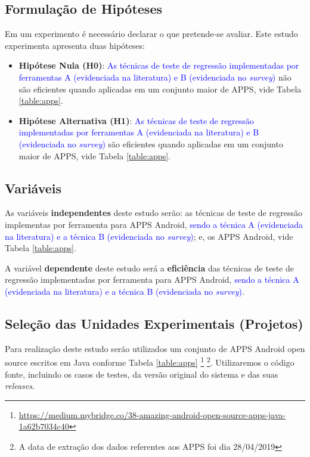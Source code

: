 \subsection{Formulação de Hipóteses}

Em um experimento é necessário declarar o que pretende-se avaliar. Este estudo experimenta apresenta duas hipóteses:

\begin{itemize}

    \item \textbf{Hipótese Nula (H0)}:
    \textcolor{blue}{As técnicas de teste de regressão implementadas por ferramentas A (evidenciada na literatura) e B (evidenciada no \textit{survey})} não são eficientes quando aplicadas em um conjunto maior de \ac{APPS}, vide Tabela \ref{table:apps}.
    
    \item \textbf{Hipótese Alternativa (H1)}:
     \textcolor{blue}{As técnicas de teste de regressão implementadas por ferramentas A (evidenciada na literatura) e B (evidenciada no \textit{survey})} são eficientes quando aplicadas em um conjunto maior de \ac{APPS}, vide Tabela \ref{table:apps}.

\end{itemize}


\subsection{Variáveis}

As variáveis \textbf{independentes} deste estudo serão: as técnicas de teste de regressão implementas por ferramenta para \ac{APPS} Android, \textcolor{blue}{sendo a técnica A (evidenciada na literatura) e a técnica B (evidenciada no \textit{survey})}; e, os \ac{APPS} Android, vide Tabela \ref{table:apps}.


A variável \textbf{dependente} deste estudo será a \textbf{eficiência} das técnicas de teste de regressão implementadas por ferramenta para \ac{APPS} Android, \textcolor{blue}{sendo a técnica A (evidenciada na literatura) e a técnica B (evidenciada no \textit{survey})}.


\subsection{Seleção das Unidades Experimentais (Projetos)}

Para realização deste estudo serão utilizados um conjunto de \ac{APPS} Android open source escritos em Java conforme Tabela \ref{table:apps} \footnote{\url{https://medium.mybridge.co/38-amazing-android-open-source-apps-java-1a62b7034c40}} \footnote{A data de extração dos dados referentes aos \ac{APPS} foi dia 28/04/2019}. Utilizaremos o código fonte, incluindo os casos de testes, da versão original do sistema e das suas \textit{releases}.




